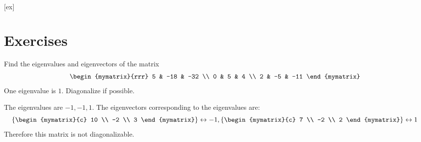 [ex]
\section*{Exercises}

\begin{enumialphparenastyle}

\begin{ex} Find the eigenvalues and eigenvectors of the matrix 
\begin{equation*}
\begin{mymatrix}{rrr}
5 & -18 & -32 \\
0 & 5 & 4 \\
2 & -5 & -11
\end{mymatrix}
\end{equation*}
One eigenvalue is $1$. Diagonalize if possible.
\begin{sol}
The eigenvalues are $-1, -1, 1$. The eigenvectors corresponding to the eigenvalues are:
\[
\set{\begin{mymatrix}{c}
10 \\
-2 \\
3
\end{mymatrix} } \leftrightarrow -1,  \set{\begin{mymatrix}{c}
7 \\
-2 \\
2
\end{mymatrix} } \leftrightarrow 1
\]
Therefore this matrix is not diagonalizable. 
\end{sol}
\end{ex}


\end{enumialphparenastyle}
